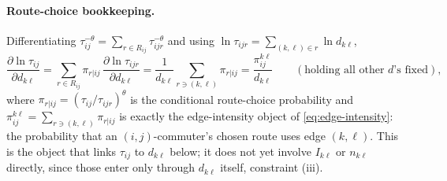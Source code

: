\documentclass[12pt, a4paper]{article}
\theoremstyle{definition}
\theoremstyle{remark}
\begin{document}
\paragraph{Route-choice bookkeeping.} Differentiating $\tau_{ij}^{-\theta}=\sum_{r\in R_{ij}}\tau_{ijr}^{-\theta}$ and using $\ln\tau_{ijr}=\sum_{(k,\ell)\in r}\ln d_{k\ell}$,
\[
\frac{\partial \ln \tau_{ij}}{\partial d_{k\ell}} = \sum_{r\in R_{ij}}\pi_{r|ij}\,\frac{\partial \ln \tau_{ijr}}{\partial d_{k\ell}} = \frac{1}{d_{k\ell}}\sum_{r\ni(k,\ell)}\pi_{r|ij} = \frac{\pi_{ij}^{k\ell}}{d_{k\ell}}\qquad(\text{holding all other }d\text{'s fixed}),
\]
where $\pi_{r|ij}=(\tau_{ij}/\tau_{ijr})^\theta$ is the conditional route-choice probability and $\pi_{ij}^{k\ell}=\sum_{r\ni(k,\ell)}\pi_{r|ij}$ is exactly the edge-intensity object of \eqref{eq:edge-intensity}: the probability that an $(i,j)$-commuter's chosen route uses edge $(k,\ell)$. This is the object that links $\tau_{ij}$ to $d_{k\ell}$ below; it does not yet involve $I_{k\ell}$ or $n_{k\ell}$ directly, since those enter only through $d_{k\ell}$ itself, constraint (iii).
\end{document}
